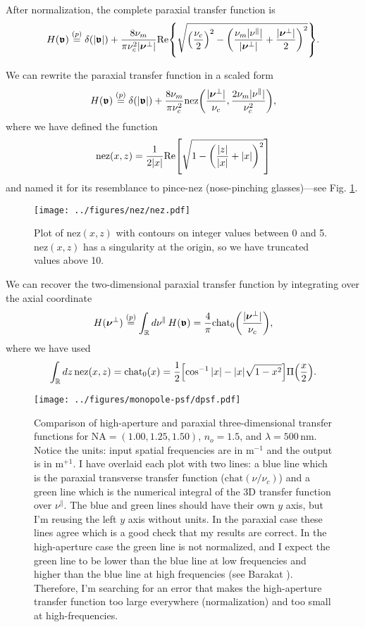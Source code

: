 \documentclass[]{osa-article}
\let\originalleft\left
\let\originalright\right
\renewcommand{\left}{\mathopen{}\mathclose\bgroup\originalleft}
\renewcommand{\right}{\aftergroup\egroup\originalright}
\providecommand{\mbb}[1]{\mathbb{#1}}
\providecommand{\bs}[1]{\boldsymbol{#1}}
\providecommand{\bv}{\boldsymbol{\mathfrak{v}}}
\providecommand{\bvperp}{\bs{\nu}^{\bot}}
\providecommand{\bvpar}{\nu^{\parallel}}
\providecommand{\eqp}{\stackrel{(p)}{=}}
\providecommand{\add}[1]{{\color{blue}#1}}
\begin{document}
After normalization, the complete paraxial transfer function is 
\begin{align}
  H(\bv) \eqp \delta(|\bv|) + \frac{8\nu_m}{\pi\nu_c^2|\bvperp|}\text{Re}\left\{\sqrt{\left(\frac{\nu_c}{2}\right)^2 - \left(\frac{\nu_m|\bvpar|}{|\bvperp|} + \frac{|\bvperp|}{2}\right)^2}\right\}.
\end{align}

We can rewrite the paraxial transfer function in a scaled form 
\begin{align}
  H(\bv) \eqp \delta(|\bv|) + \frac{8\nu_m}{\pi\nu_c^2}\text{nez}\left(\frac{|\bvperp|}{\nu_c}, \frac{2\nu_m|\bvpar|}{\nu_c^2}\right),
\end{align}
where we have defined the function
\begin{align}
 \text{nez}(x, z) = \frac{1}{2|x|}\text{Re}\left[\sqrt{1 - \left(\frac{|z|}{|x|} + |x|\right)^2}\right]
\end{align}
and named it for its resemblance to pince-nez (nose-pinching glasses)---see Fig. \ref{fig:nez}.
\begin{figure}
  \centering
  \texttt{[image: ../figures/nez/nez.pdf]}
  \caption{Plot of $\text{nez}(x,z)$ with contours on integer values between 0 and 5. $\text{nez}(x,z)$ has a singularity at the origin, so we have truncated values above 10.}
  \label{fig:nez}
\end{figure}

We can recover the two-dimensional paraxial transfer function by integrating over the axial coordinate
\begin{align}
  H(\bvperp) \eqp \int_{\mbb{R}}d\bvpar\, H(\bv) = \frac{4}{\pi}\text{chat}_0\left(\frac{|\bvperp|}{\nu_c}\right), 
\end{align}
where we have used
\begin{align}
  \int_{\mbb{R}}dz\,\text{nez}(x,z) = \text{chat}_0(x) = \frac{1}{2}\left[\cos^{-1}|x| - |x|\sqrt{1-x^2}\right]\Pi\left(\frac{x}{2}\right).
\end{align}

\begin{figure}
  \centering
  \texttt{[image: ../figures/monopole-psf/dpsf.pdf]}
  \caption{Comparison of high-aperture and paraxial three-dimensional transfer functions for $\text{NA} = (1.00, 1.25, 1.50)$, $n_o = 1.5$, and $\lambda = 500\,\text{nm}$. \add{Notice the units: input spatial frequencies are in  m${}^{-1}$ and the output is in m${}^{+1}$. I have overlaid each plot with two lines: a blue line which is the paraxial transverse transfer function ($\text{chat}(\nu/\nu_c)$) and a green line which is the numerical integral of the 3D transfer function over $\bvpar$. The blue and green lines should have their own $y$ axis, but I'm reusing the left $y$ axis without units. In the paraxial case these lines agree which is a good check that my results are correct. In the high-aperture case the green line is not normalized, and I expect the green line to be lower than the blue line at low frequencies and higher than the blue line at high frequencies (see Barakat \cite{barakat1963}). Therefore, I'm searching for an error that makes the high-aperture transfer function too large everywhere (normalization) and too small at high-frequencies.}}
  \label{fig:compare}
\end{figure}
\end{document}
